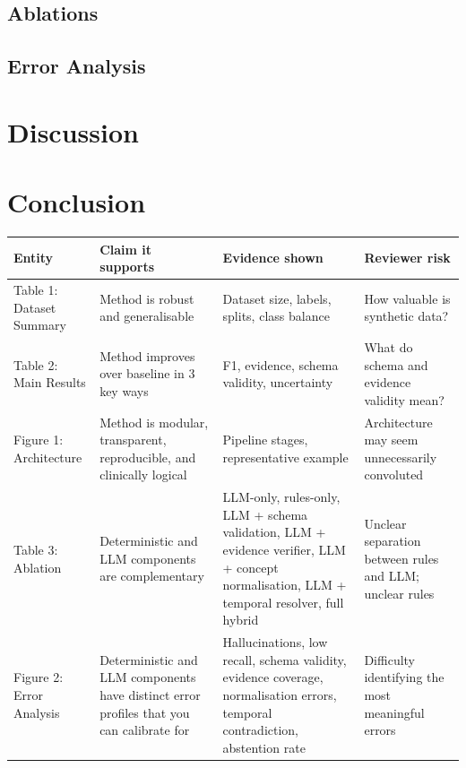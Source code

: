 \documentclass[conference]{IEEEtran}
\begin{document}
\subsection{Ablations}
\subsection{Error Analysis}

\section{Discussion}

\section{Conclusion}

\begin{tabularx}{\linewidth}{|Y|Y|Y|Y|}
\hline
\textbf{Entity} &
\textbf{Claim it supports} &
\textbf{Evidence shown} &
\textbf{Reviewer risk} \\
\hline

Table 1: Dataset Summary &
Method is robust and generalisable &
Dataset size, labels, splits, class balance &
How valuable is synthetic data? \\
\hline

Table 2: Main Results &
Method improves over baseline in 3 key ways &
F1, evidence, schema validity, uncertainty &
What do schema and evidence validity mean? \\
\hline

Figure 1: Architecture &
Method is modular, transparent, reproducible, and clinically logical &
Pipeline stages, representative example &
Architecture may seem unnecessarily convoluted \\
\hline

Table 3: Ablation &
Deterministic and LLM components are complementary &
LLM-only, rules-only, LLM + schema validation, LLM + evidence verifier,
LLM + concept normalisation, LLM + temporal resolver, full hybrid &
Unclear separation between rules and LLM; unclear rules \\
\hline

Figure 2: Error Analysis &
Deterministic and LLM components have distinct error profiles that you can calibrate for &
Hallucinations, low recall, schema validity, evidence coverage,
normalisation errors, temporal contradiction, abstention rate &
Difficulty identifying the most meaningful errors \\
\hline
\end{tabularx}
\end{document}
